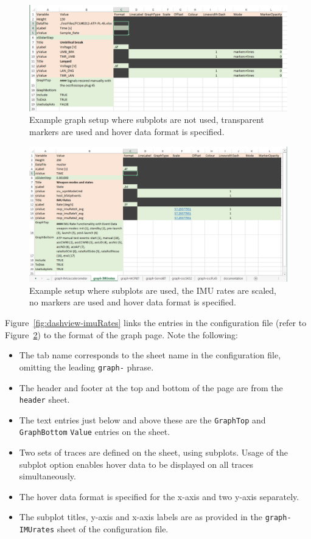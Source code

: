 \begin{figure}[h]
\centering
\includegraphics[width=\textwidth]{pic/dashview-config-oscPL45}
\caption{Example graph setup where subplots are not used, transparent markers are used and hover data format is specified.
\label{fig:dashview-config-oscPL45}}
\end{figure}
\begin{figure}[h]
\centering
\includegraphics[width=\textwidth]{pic/dashview-config-imuRates}
\caption{Example setup where subplots are used, the IMU rates are scaled, no markers are used and hover data format is specified.
\label{fig:dashview-config-imuRates}}
\end{figure}

Figure~\ref{fig:dashview-imuRates} links the entries in the configuration file (refer to Figure~\ref{fig:dashview-config-imuRates}) to the format of the graph page. Note the following:

\begin{itemize}
  \item The tab name corresponds to the sheet name in the configuration file, omitting the leading \texttt{graph-} phrase.
  \item The header and footer at the top and bottom of the page are from the \texttt{header} sheet.
  \item The text entries just below and above these are the \texttt{GraphTop} and \texttt{GraphBottom} \texttt{Value} entries on the sheet.
  \item Two sets of traces are defined on the sheet, using subplots. Usage of the subplot option enables hover data to be displayed on all traces simultaneously.
  \item The hover data format is specified for the x-axis and two y-axis separately.
  \item The subplot titles, y-axis and x-axis labels are as provided in the \texttt{graph-IMUrates} sheet of the configuration file.
\end{itemize}

